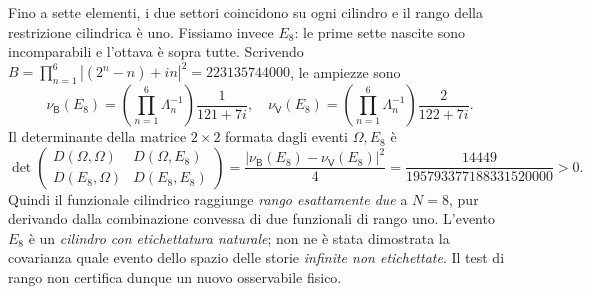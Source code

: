 \documentclass[11pt,a4paper]{article}
\begin{document}
Fino a sette elementi, i due settori coincidono su ogni cilindro e il rango della restrizione cilindrica \`e uno. Fissiamo invece $E_8$: le prime sette nascite sono incomparabili e l'ottava \`e sopra tutte. Scrivendo $B=\prod_{n=1}^{6}|(2^n-n)+in|^2=223135744000$, le ampiezze sono
\begin{equation}
\nu_{\mathsf B}(E_8)=\left(\prod_{n=1}^{6}\Lambda_n^{-1}\right)\frac1{121+7i},\quad
\nu_{\mathsf V}(E_8)=\left(\prod_{n=1}^{6}\Lambda_n^{-1}\right)\frac2{122+7i}.\tag{DS.7}
\end{equation}
Il determinante della matrice $2\times2$ formata dagli eventi $\Omega,E_8$ \`e
\begin{equation}
\boxed{\det\begin{pmatrix}D(\Omega,\Omega)&D(\Omega,E_8)\\D(E_8,\Omega)&D(E_8,E_8)\end{pmatrix}
=\frac{|\nu_{\mathsf B}(E_8)-\nu_{\mathsf V}(E_8)|^2}{4}
=\frac{14449}{195793377188331520000}>0.}\tag{DS.8}
\end{equation}
Quindi il funzionale cilindrico raggiunge \emph{rango esattamente due} a $N=8$, pur derivando dalla combinazione convessa di due funzionali di rango uno. L'evento $E_8$ \`e un \emph{cilindro con etichettatura naturale}; non ne \`e stata dimostrata la covarianza quale evento dello spazio delle storie \emph{infinite non etichettate}. Il test di rango non certifica dunque un nuovo osservabile fisico.

\clearpage
\end{document}
